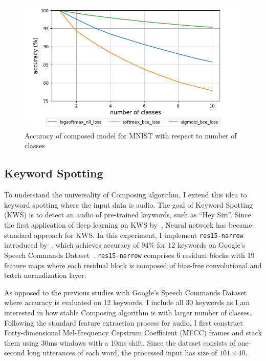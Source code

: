 \documentclass{article}
\begin{document}
\begin{figure}[t]
    \centering
    \includegraphics[scale=0.5,trim={0mm 0mm 0mm 0mm},clip]{mnist.png}
    \caption{Accuracy of composed model for MNIST with respect to number of classes}
    \label{figure:composed_mnist}
\end{figure}

\subsection{Keyword Spotting}

To understand the universality of Composing algorithm, I extend this idea to keyword spotting where the input data is audio. The goal of Keyword Spotting (KWS) is to detect an audio of pre-trained keywords, such as “Hey Siri”. Since the first application of deep learning on KWS by~\cite{chen2014small}, Neural network has became standard approach for KWS. In this experiment, I implement \texttt{res15-narrow} introduced by~\cite{tang2018deep}, which achieves accuracy of 94\% for 12 keywords on Google’s Speech Commands Dataset~\cite{speechcommandsdataset}. \texttt{res15-narrow} comprises 6 residual blocks with 19 feature maps where each residual block is composed of bias-free convolutional and batch normalization layer.

As opposed to the previous studies with Google’s Speech Commands Dataset where accuracy is evaluated on 12 keywords, I include all 30 keywords as I am interested in how stable Composing algorithm is with larger number of classes. Following the standard feature extraction process for audio, I first construct Forty-dimensional Mel-Frequency Cepstrum Coefficient (MFCC) frames and stack them using 30ms windows with a 10ms shift. Since the dataset consists of one-second long utterances of each word, the processed input has size of $101\times40$.
\end{document}
